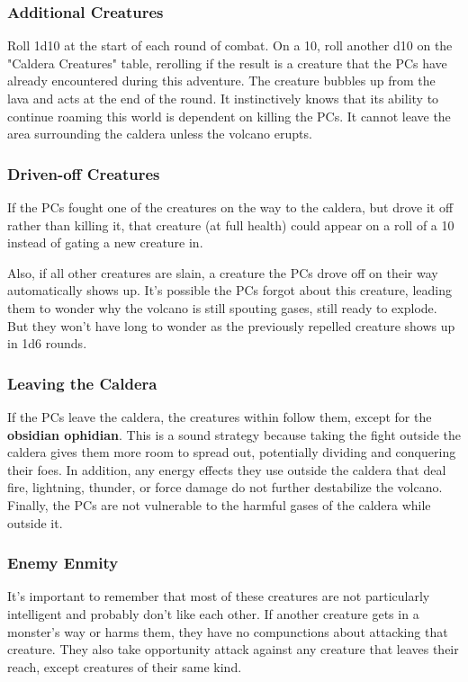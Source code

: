 \documentclass[10pt,a4paper,twoside,bg=print,twocolumn,openany,nodeprecatedcode]{dndbook}
\begin{document}
\subsubsection{Additional Creatures}
Roll 1d10 at the start of each round of combat. On a 10, roll another d10 on the "Caldera Creatures" table, rerolling if the result is a creature that the PCs have already encountered during this adventure. The creature bubbles up from the lava and acts at the end of the round. It instinctively knows that its ability to continue roaming this world is dependent on killing the PCs. It cannot leave the area surrounding the caldera unless the volcano erupts.

\subsubsection{Driven-off Creatures}
If the PCs fought one of the creatures on the way to the caldera, but drove it off rather than killing it, that creature (at full health) could appear on a roll of a 10 instead of gating a new creature in.

Also, if all other creatures are slain, a creature the PCs drove off on their way automatically shows up. It's possible the PCs forgot about this creature, leading them to wonder why the volcano is still spouting gases, still ready to explode. But they won't have long to wonder as the previously repelled creature shows up in 1d6 rounds.

\subsubsection{Leaving the Caldera}
If the PCs leave the caldera, the creatures within follow them, except for the \textbf{obsidian ophidian}. This is a sound strategy because taking the fight outside the caldera gives them more room to spread out, potentially dividing and conquering their foes. In addition, any energy effects they use outside the caldera that deal fire, lightning, thunder, or force damage do not further destabilize the volcano. Finally, the PCs are not vulnerable to the harmful gases of the caldera while outside it.

\subsubsection{Enemy Enmity}
It's important to remember that most of these creatures are not particularly intelligent and probably don't like each other. If another creature gets in a monster's way or harms them, they have no compunctions about attacking that creature. They also take opportunity attack against any creature that leaves their reach, except creatures of their same kind.
\end{document}
